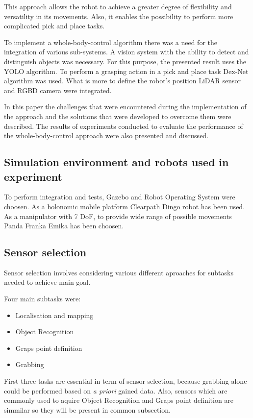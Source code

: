 \documentclass[conference,a4paper]{IEEEtran}
\begin{document}
This approach allows the robot to achieve a greater degree of flexibility and versatility in its movements. Also, it enables the possibility to perform more complicated pick and place tasks.

To implement a whole-body-control algorithm there was a need for the integration of various sub-systems. A vision system with the ability to detect and distinguish objects was necessary. For this purpose, the presented result uses the YOLO algorithm. To perform a grasping action in a pick and place task Dex-Net algorithm was used. What is more to define the robot's position LiDAR sensor and RGBD camera were integrated. 

In this paper the challenges that were encountered during the implementation of the approach and the solutions that were developed to overcome them were described. 
The results of experiments conducted to evaluate the performance of the whole-body-control approach were also presented and discussed.

\subsection{Simulation environment and robots used in experiment} 
To perform integration and tests, Gazebo and Robot Operating System were choosen. As a holonomic mobile platform Clearpath Dingo robot has been used. As a manipulator with 7 DoF,  to provide wide range of possible movements Panda Franka Emika has been choosen.

\subsection{Sensor selection}
Sensor selection involves considering various different aproaches for subtasks needed to achieve main goal.

Four main subtasks were:
\begin{itemize}
  \item Localisation and mapping
  \item Object Recognition
  \item Graps point definition
  \item Grabbing
\end{itemize}

First three tasks are essential in term of sensor selection, because grabbing alone could be performed based on \textit{a priori} gained data. Also, sensors which are commonly used to aquire Object Recognition and Graps point definition are simmilar so they will be present in common subsection.
\end{document}
